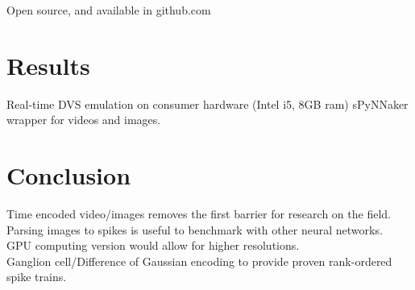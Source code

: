 \documentclass[twocolumn]{article}
\begin{document}
Open source, and available in github.com\\

\section{Results}

Real-time DVS emulation on consumer hardware (Intel i5, 8GB ram)
sPyNNaker wrapper for videos and images.





\section{Conclusion}

Time encoded video/images removes the first barrier for research on the field.\\

Parsing images to spikes is useful to benchmark with other neural networks.\\

GPU computing version would allow for higher resolutions.\\

Ganglion cell/Difference of Gaussian encoding to provide proven rank-ordered spike trains.\\

\printbibliography
\end{document}
